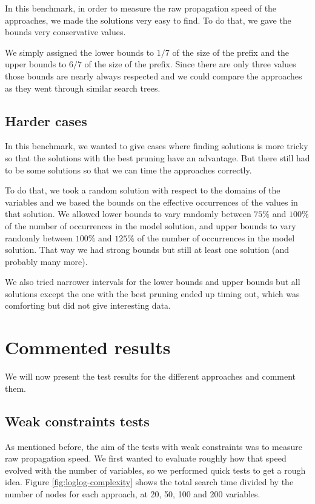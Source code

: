 \documentclass[a4paper,10pt]{article}
\begin{document}
In this benchmark, in order to measure the raw propagation speed of the approaches, we made the solutions very easy to find. To do that, we gave the bounds very conservative values.

We simply assigned the lower bounds to $1/7$ of the size of the prefix and the upper bounds to $6/7$ of the size of the prefix. Since there are only three values those bounds are nearly always respected and we could compare the approaches as they went through similar search trees.

\subsection{Harder cases}
\label{subsec:tests-hard}

In this benchmark, we wanted to give cases where finding solutions is more tricky so that the solutions with the best pruning have an advantage. But there still had to be some solutions so that we can time the approaches correctly.

To do that, we took a random solution with respect to the domains of the variables and we based the bounds on the effective occurrences of the values in that solution. We allowed lower bounds to vary randomly between $75\%$ and $100\%$ of the number of occurrences in the model solution, and upper bounds to vary randomly between $100\%$ and $125\%$ of the number of occurrences in the model solution. That way we had strong bounds but still at least one solution (and probably many more).

We also tried narrower intervals for the lower bounds and upper bounds but all solutions except the one with the best pruning ended up timing out, which was comforting but did not give interesting data.

\section{Commented results}

We will now present the test results for the different approaches and comment them.

\subsection{Weak constraints tests}

As mentioned before, the aim of the tests with weak constraints was to measure raw propagation speed. We first wanted to evaluate roughly how that speed evolved with the number of variables, so we performed quick tests to get a rough idea. Figure \ref{fig:loglog-complexity} shows the total search time divided by the number of nodes for each approach, at 20, 50, 100 and 200 variables.
\end{document}
